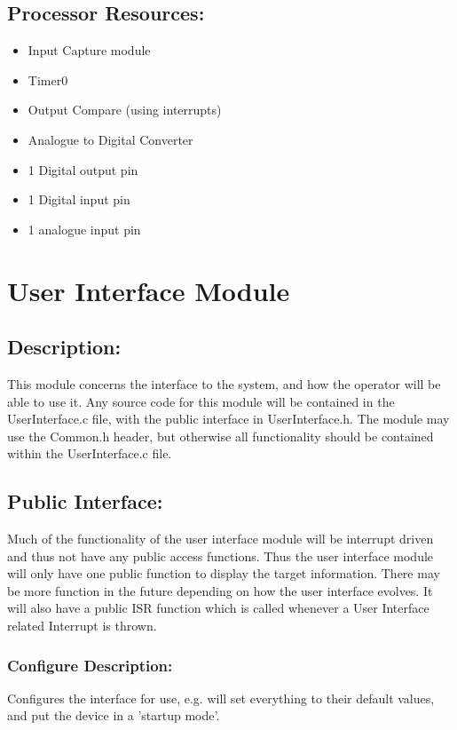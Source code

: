 \documentclass[]{article}
\begin{document}
\subsection{Processor Resources:}
\begin{itemize}
	\item Input Capture module
	\item Timer0
	\item Output Compare (using interrupts)
	\item Analogue to Digital Converter
	\item 1 Digital output pin
	\item 1 Digital input pin
	\item 1 analogue input pin
\end{itemize}

\newpage
\section{User Interface Module}

\subsection{Description:}
This module concerns the interface to the system, and how the operator will be able to use it. Any source code for this module will be contained in the UserInterface.c file, with the public interface in UserInterface.h. The module may use the Common.h header, but otherwise all functionality should be contained within the UserInterface.c file.

\subsection{Public Interface:}
Much of the functionality of the user interface module will be interrupt driven and thus not have any public access functions. Thus the user interface module will only have one public function to display the target information. There may be more function in the future depending on how the user interface evolves. It will also have a public ISR function which is called whenever a User Interface related Interrupt is thrown.

\subsubsection{Configure Description:}
Configures the interface for use, e.g. will set everything to their default values, and put the device in a 'startup mode'.
\end{document}
